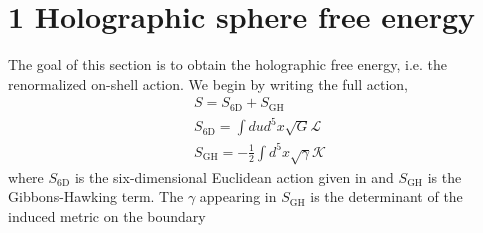 \documentclass{article}
\begin{document}
\section*{1 Holographic sphere free energy}
The goal of this section is to obtain the holographic free energy, i.e. the renormalized on-shell action. We begin by writing the full action,
\[
\begin{array}{c}
S=S_{6 \mathrm{D}}+S_{\mathrm{GH}} \\
S_{6 \mathrm{D}}=\int d u d^{5} x \sqrt{G} \mathcal{L} \\
S_{\mathrm{GH}}=-\frac{1}{2} \int d^{5} x \sqrt{\gamma} \mathcal{K}
\end{array}
\]
where \(S_{6 \mathrm{D}}\) is the six-dimensional Euclidean action given in and \(S_{\mathrm{GH}}\) is the Gibbons-Hawking term. The \(\gamma\) appearing in \(S_{\mathrm{GH}}\) is the determinant of the induced metric on the boundary
\end{document}
